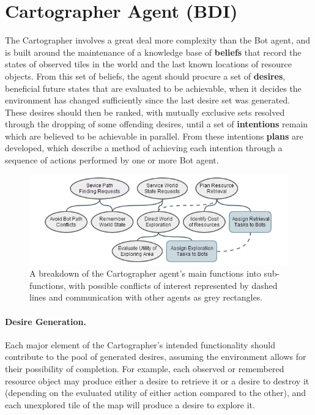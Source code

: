 \documentclass[a4paper,10pt]{article}
\begin{document}
\section{Cartographer Agent (BDI)}
The Cartographer involves a great deal more complexity than the Bot agent, and is built around the maintenance of a knowledge base of \textbf{beliefs} that record the states of observed tiles in the world and the last known locations of resource objects. From this set of beliefs, the agent should procure a set of \textbf{desires}, beneficial future states that are evaluated to be achievable, when it decides the environment has changed sufficiently since the last desire set was generated. These desires should then be ranked, with mutually exclusive sets resolved through the dropping of some offending desires, until a set of \textbf{intentions} remain which are believed to be achievable in parallel. From these intentions \textbf{plans} are developed, which describe a method of achieving each intention through a sequence of actions performed by one or more Bot agent.

\begin{figure}[ht]
  \centering
  \includegraphics[width=0.8\linewidth]{cartographer}
  \begin{minipage}[t]{0.8\textwidth}
    \caption{A breakdown of the Cartographer agent's main functions into sub-functions, with possible conflicts of interest represented by dashed lines and communication with other agents as grey rectangles.}
  \end{minipage}
\end{figure}

\paragraph{Desire Generation.}
Each major element of the Cartographer's intended functionality should contribute to the pool of generated desires, assuming the environment allows for their possibility of completion. For example, each observed or remembered resource object may produce either a desire to retrieve it or a desire to destroy it (depending on the evaluated utility of either action compared to the other), and each unexplored tile of the map will produce a desire to explore it.
\end{document}
